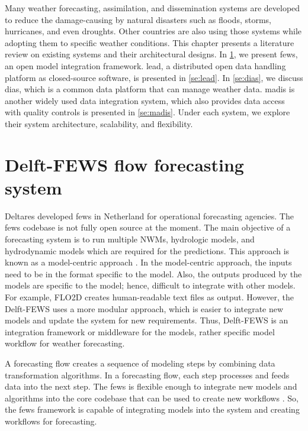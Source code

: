Many weather forecasting, assimilation, and dissemination systems are developed to reduce the damage-causing by natural disasters such as floods, storms, hurricanes, and even droughts. Other countries are also using those systems while adopting them to specific weather conditions. This chapter presents a literature review on existing systems and their architectural designs. In \cref{se:fews}, we present \acrfull{fews}, an open model integration framework. \acrfull{lead}, a distributed open data handling platform as closed-source software, is presented in \cref{se:lead}. In \cref{se:dias}, we discuss \acrfull{dias}, which is a common data platform that can manage weather data. \acrfull{madis} is another widely used data integration system, which also provides data access with quality controls is presented in \cref{se:madis}. Under each system, we explore their system architecture, scalability, and flexibility.

\section{Delft-FEWS flow forecasting system}
\label{se:fews}

Deltares developed \acrshort{fews} \cite{Werner2013TheSystem} in Netherland for operational forecasting agencies. The \acrshort{fews} codebase is not fully open source at the moment. The main objective of a forecasting system is to run multiple NWMs, hydrologic models, and hydrodynamic models which are required for the predictions. This approach is known as a model-centric approach \cite{Werner2005FloodCatchments}. In the model-centric approach, the inputs need to be in the format specific to the model. Also, the outputs produced by the models are specific to the model; hence, difficult to integrate with other models. For example, FLO2D creates human-readable text files as output. However, the Delft-FEWS uses a more modular approach, which is easier to integrate new models and update the system for new requirements. Thus, Delft-FEWS is an integration framework or middleware for the models, rather specific model workflow for weather forecasting.

A forecasting flow creates a sequence of modeling steps by combining data transformation algorithms. In a forecasting flow, each step processes and feeds data into the next step. The \acrshort{fews} is flexible enough to integrate new models and algorithms into the core codebase that can be used to create new workflows \cite{Werner2013TheSystem}. So, the \acrshort{fews} framework is capable of integrating models into the system and creating workflows for forecasting.

